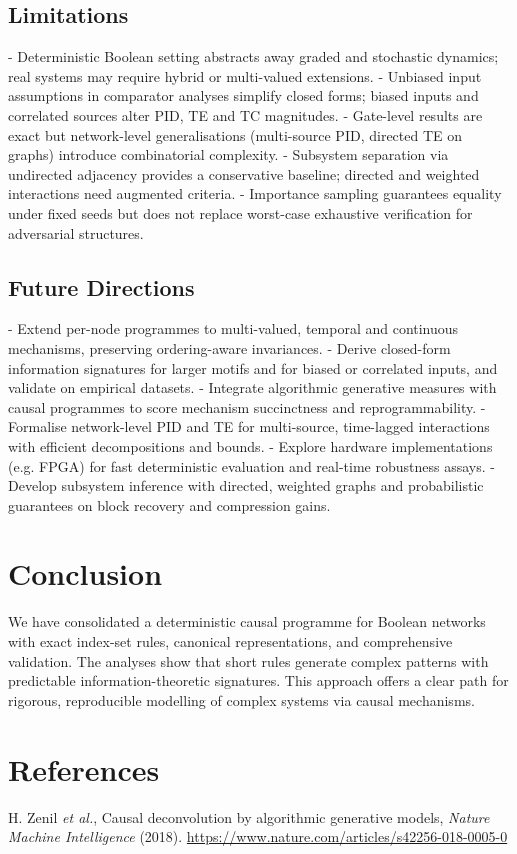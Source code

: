 \documentclass[11pt]{article}
\begin{document}
\subsection{Limitations}
- Deterministic Boolean setting abstracts away graded and stochastic dynamics; real systems may require hybrid or multi-valued extensions.
- Unbiased input assumptions in comparator analyses simplify closed forms; biased inputs and correlated sources alter PID, TE and TC magnitudes.
- Gate-level results are exact but network-level generalisations (multi-source PID, directed TE on graphs) introduce combinatorial complexity.
- Subsystem separation via undirected adjacency provides a conservative baseline; directed and weighted interactions need augmented criteria.
- Importance sampling guarantees equality under fixed seeds but does not replace worst-case exhaustive verification for adversarial structures.

\subsection{Future Directions}
- Extend per-node programmes to multi-valued, temporal and continuous mechanisms, preserving ordering-aware invariances.
- Derive closed-form information signatures for larger motifs and for biased or correlated inputs, and validate on empirical datasets.
- Integrate algorithmic generative measures with causal programmes to score mechanism succinctness and reprogrammability.
- Formalise network-level PID and TE for multi-source, time-lagged interactions with efficient decompositions and bounds.
- Explore hardware implementations (e.g. FPGA) for fast deterministic evaluation and real-time robustness assays.
- Develop subsystem inference with directed, weighted graphs and probabilistic guarantees on block recovery and compression gains.

\section{Conclusion}
We have consolidated a deterministic causal programme for Boolean networks with exact index-set rules, canonical representations, and comprehensive validation. The analyses show that short rules generate complex patterns with predictable information-theoretic signatures. This approach offers a clear path for rigorous, reproducible modelling of complex systems via causal mechanisms.

\section{References}
\noindent H. Zenil \emph{et al.}, Causal deconvolution by algorithmic generative models, \textit{Nature Machine Intelligence} (2018). \url{https://www.nature.com/articles/s42256-018-0005-0}
\end{document}
